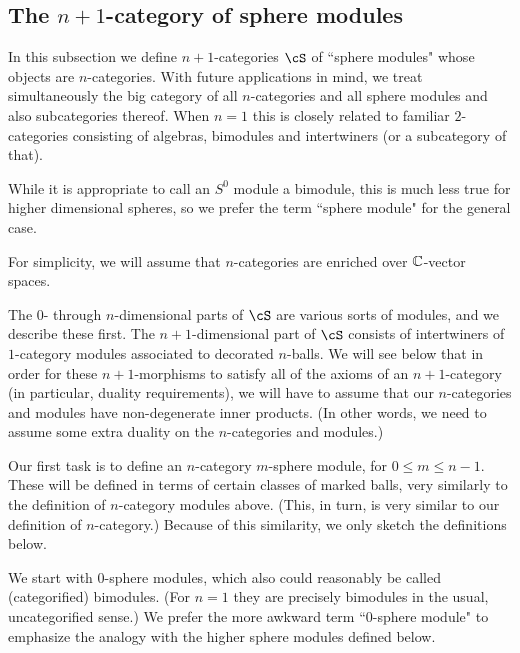 \subsection{The \texorpdfstring{$n{+}1$}{n+1}-category of sphere modules}
\label{ssec:spherecat}

In this subsection we define $n{+}1$-categories $\cS$ of ``sphere modules" 
whose objects are $n$-categories.
With future applications in mind, we treat simultaneously the big category
of all $n$-categories and all sphere modules and also subcategories thereof.
When $n=1$ this is closely related to familiar $2$-categories consisting of 
algebras, bimodules and intertwiners (or a subcategory of that).

While it is appropriate to call an $S^0$ module a bimodule,
this is much less true for higher dimensional spheres, 
so we prefer the term ``sphere module" for the general case.


For simplicity, we will assume that $n$-categories are enriched over $\mathbb{C}$-vector spaces.

The $0$- through $n$-dimensional parts of $\cS$ are various sorts of modules, and we describe
these first.
The $n{+}1$-dimensional part of $\cS$ consists of intertwiners
of  $1$-category modules associated to decorated $n$-balls.
We will see below that in order for these $n{+}1$-morphisms to satisfy all of
the axioms of an $n{+}1$-category (in particular, duality requirements), we will have to assume
that our $n$-categories and modules have non-degenerate inner products.
(In other words, we need to assume some extra duality on the $n$-categories and modules.)

\medskip

Our first task is to define an $n$-category $m$-sphere module, for $0\le m \le n-1$.
These will be defined in terms of certain classes of marked balls, very similarly
to the definition of $n$-category modules above.
(This, in turn, is very similar to our definition of $n$-category.)
Because of this similarity, we only sketch the definitions below.

We start with $0$-sphere modules, which also could reasonably be called (categorified) bimodules.
(For $n=1$ they are precisely bimodules in the usual, uncategorified sense.)
We prefer the more awkward term ``0-sphere module" to emphasize the analogy
with the higher sphere modules defined below.

